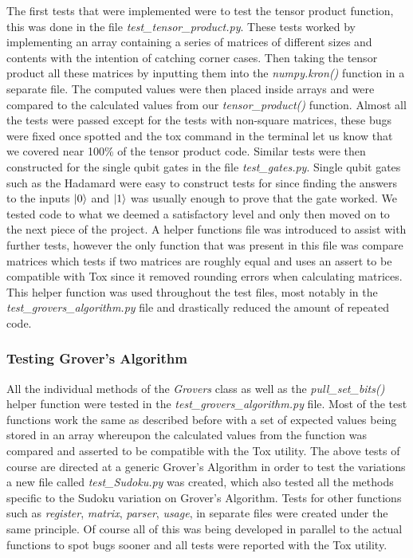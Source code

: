 \documentclass{article}
\begin{document}
 The first tests that were implemented were to test the tensor product function, this was done in the file \textit{test\_tensor\_product.py}. These tests worked by implementing an array containing a series of matrices of different sizes and contents with the intention of catching corner cases. Then taking the tensor product all these matrices by inputting them into the \textit{numpy.kron()} function in a separate file. The computed values were then placed inside arrays and were compared to the calculated values from our \textit{tensor\_product()} function. Almost all the tests were passed except for the tests with non-square matrices, these bugs were fixed once spotted and the tox command in the terminal let us know that we covered near 100\% of the tensor product code. Similar tests were then constructed for the single qubit gates in the file \textit{test\_gates.py}. Single qubit gates such as the Hadamard were easy to construct tests for since finding the answers to the inputs $\ket{0}$ and $\ket{1}$ was usually enough to prove that the gate worked. We tested code to what we deemed a satisfactory level and only then moved on to the next piece of the project. A helper functions file was introduced to assist with further tests, however the only function that was present in this file was compare matrices which tests if two matrices are roughly equal and uses an assert to be compatible with Tox since it removed rounding errors when calculating matrices. This helper function was used throughout the test files, most notably in the \textit{test\_grovers\_algorithm.py} file and drastically reduced the amount of repeated code.
 
\subsubsection{Testing Grover's Algorithm}

All the individual methods of the \textit{Grovers} class as well as the \textit{pull\_set\_bits()} helper function were tested in the \textit{test\_grovers\_algorithm.py} file. Most of the test functions work the same as described before with a set of expected values being stored in an array whereupon the calculated values from the function was compared and asserted to be compatible with the Tox utility. The above tests of course are directed at a generic Grover's Algorithm in order to test the variations a new file called \textit{test\_Sudoku.py} was created, which also tested all the methods specific to the Sudoku variation on Grover's Algorithm. Tests for other functions such as \textit{register}, \textit{matrix}, \textit{parser}, \textit{usage}, in separate files were created under the same principle. Of course all of this was being developed in parallel to the actual functions to spot bugs sooner and all tests were reported with the Tox utility.
\end{document}
